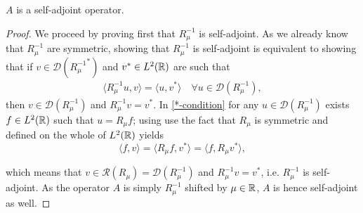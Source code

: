 \begin{theorem} \label{2.3:thm-ASelfAdjoint}
	$A$ is a self-adjoint operator.
		
	\begin{proof}
		We proceed by proving first that $R_{\mu}^{-1}$ is self-adjoint. As we already know that $R_{\mu}^{-1}$ are symmetric, showing that $R_{\mu}^{-1}$ is self-adjoint is equivalent to showing that if $v \in \mathcal{D}({R_{\mu}^{-1}}^{*})$ and $v^{*} \in L^{2}(\mathbb{R})$ are such that %
		\begin{align}
			\langle R_{\mu}^{-1} u, v \rangle = \langle u, v^{*} \rangle \quad \forall u \in \mathcal{D}(R_{\mu}^{-1}), \label{*-condition}
		\end{align}
		then $v \in \mathcal{D}(R_{\mu}^{-1})$ and $R_{\mu}^{-1} v = v^{*}$.
		In \eqref{*-condition} for any $u \in \mathcal{D}(R_{\mu}^{-1})$ exists $f \in L^{2}(\mathbb{R})$ such that $u = R_{\mu} f$; using use the fact that $R_{\mu}$ is symmetric and defined on the whole of $L^{2}(\mathbb{R})$ yields
		\[  \langle f, v \rangle = \langle R_{\mu} f, v^{*} \rangle = \langle f, R_{\mu} v^{*} \rangle, \]
		
		which means that $v \in \mathcal{R}(R_{\mu}) = \mathcal{D}(R_{\mu}^{-1})$ and $R_{\mu}^{-1} v = v^{*}$, i.e. $R_{\mu}^{-1}$ is self-adjoint. As the operator $A$ is simply $R_{\mu}^{-1}$ shifted by $\mu \in \mathbb{R}$, $A$ is hence self-adjoint as well.		
	\end{proof}
\end{theorem}
